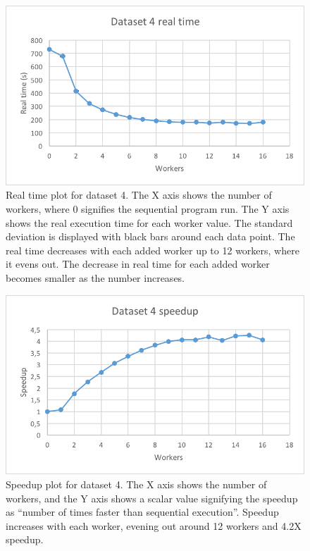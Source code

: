 \begin{figure}[ht]
  \centering
  \includegraphics[width=120mm]{figures/dataset_4/dataset_4_real_time.png}
  \caption[Real time plot for dataset 4.]{Real time plot for dataset 4. The X axis shows the number of workers, where 0 signifies the sequential program run.
  The Y axis shows the real execution time for each worker value. The standard deviation is displayed with black bars around each data point. The real time
  decreases with each added worker up to 12 workers, where it evens out. The decrease in real time for each added worker becomes smaller as the number increases.}
  \label{fig:dataset_4_real_time}
\end{figure}

\begin{figure}[ht]
  \centering
  \includegraphics[width=120mm]{figures/dataset_4/dataset_4_speedup.png}
  \caption[Speedup plot for dataset 4.]{Speedup plot for dataset 4. The X axis shows the number of workers, and the Y axis shows a scalar value signifying the speedup as
  ``number of times faster than sequential execution''. Speedup increases with each worker, evening out around 12 workers and 4.2X speedup.}
  \label{fig:dataset_4_speedup}
\end{figure}

